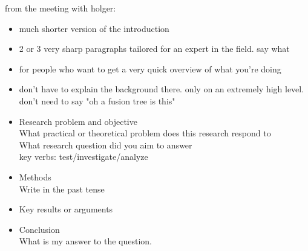 from the meeting with holger:
\begin{itemize}
    \item
    much shorter version of the introduction
    
    \item
    2 or 3 very sharp paragraphs tailored for an expert in the field. say what 
    
    \item
    for people who want to get a very quick overview of what you're doing
    
    \item
    don't have to explain the background there. only on an extremely high level. don't need to say "oh a fusion tree is this"
\end{itemize}


\begin{itemize}
    \item
    Research problem and objective\\
    What practical or theoretical problem does this research respond to\\
    What research question did you aim to answer\\
    key verbs: test/investigate/analyze\\
    \item
    Methods\\
    Write in the past tense
    \item
    Key results or arguments
    \item
    Conclusion\\
    What is my answer to the question.
\end{itemize}